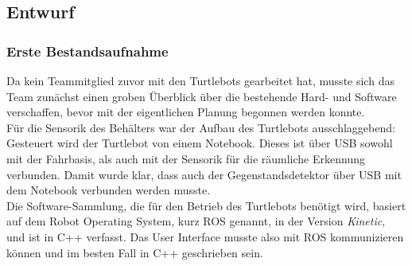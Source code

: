 \documentclass[a4paper,12pt,headsepline]{scrartcl}
\begin{document}
	\subsection{Entwurf}
	\subsubsection{Erste Bestandsaufnahme}
		Da kein Teammitglied zuvor mit den Turtlebots gearbeitet hat, musste sich das Team zunächst einen groben Überblick über die bestehende Hard- und Software verschaffen, bevor mit der eigentlichen Planung begonnen werden konnte.\\
		Für die Sensorik des Behälters war der Aufbau des Turtlebots ausschlaggebend: Gesteuert wird der Turtlebot von einem Notebook. Dieses ist über USB sowohl mit der Fahrbasis, als auch mit der Sensorik für die räumliche Erkennung verbunden. Damit wurde klar, dass auch der Gegenstandsdetektor über USB mit dem Notebook verbunden werden musste. \\
		Die Software-Sammlung, die für den Betrieb des Turtlebots benötigt wird, basiert auf dem \glqq Robot Operating System\grqq , kurz ROS genannt, in der Version \textit{Kinetic}, und ist in C++ verfasst. Das User Interface musste also mit ROS kommunizieren können und im besten Fall in C++ geschrieben sein.
\end{document}
